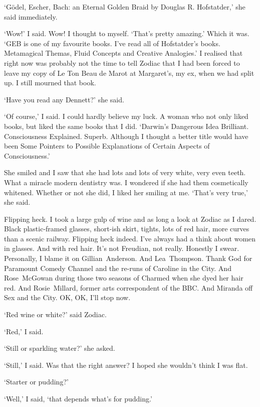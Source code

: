 `{\twelvesl Gödel, Escher, Bach: an Eternal Golden Braid} by
Douglas R. Hofstatder,' she said immediately.

`Wow!' I said. Wow! I thought to myself. `That's pretty
amazing.' Which it was. `{\twelvesl GEB\/} is one of my favourite books. I've read
all of Hofstatder's books. {\twelvesl Metamagical Themas},
{\twelvesl Fluid Concepts and Creative Analogies.}' I realised that
right now was probably not the time to tell Zodiac that I had been
forced to leave my copy of {\twelvesl Le Ton Beau de Marot\/} at
Margaret's, my ex, when we had split up. I still mourned that book.

`Have you read any Dennett?' she said.

`Of course,' I said. I could hardly believe my luck. A woman who
not only liked books, but liked the same books that I did.
`{\twelvesl Darwin's Dangerous Idea} Brilliant. {\twelvesl
Consciousness Explained}. Superb. Although I thought a better title
would have been {\twelvesl Some Pointers to Possible Explanations of
Certain Aspects of Consciousness}.'

She smiled and I saw that she had lots and lots of very white, very
even teeth. What a miracle modern dentistry was. I wondered if she
had them cosmetically whitened. Whether or not she did, I liked her
smiling at me. `That's very true,' she said.

Flipping heck. I took a large gulp of wine and as long a look at
Zodiac as I dared. Black plastic-framed glasses, short-ish skirt,
tights, lots of red hair, more curves than a scenic railway. Flipping heck
indeed. I've always had a think about women in glasses. And with red
hair. It's not Freudian, not really. Honestly I swear. Personally, I
blame it on Gillian~Anderson. And Lea~Thompson. Thank God for
Paramount Comedy Channel and the re-runs of {\twelvesl Caroline in
the City}. And Rose~McGowan during those two seasons of {\twelvesl
Charmed\/} when she dyed her hair red. And Rosie~Millard, former
arts correspondent of the BBC. And Miranda off {\twelvesl Sex and
the City\/}. OK, OK, I'll stop now.

`Red wine or white?' said Zodiac.

`Red,' I said.

`Still or sparkling water?' she asked.

`Still,' I said. Was that the right answer? I hoped she wouldn't
think I was flat.

`Starter or pudding?'

`Well,' I said, `that depends what's for pudding.'

